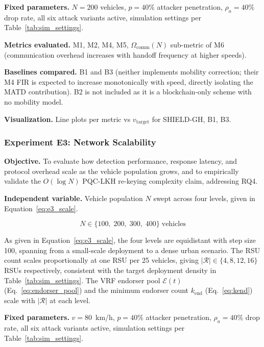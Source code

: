 \documentclass[12pt, a4paper]{report}
\newcommand{\mypar}{\vspace{0.8em}\noindent}
\begin{document}
\mypar
\textbf{Fixed parameters.}
$N = 200$ vehicles, $p = 40\%$ attacker penetration,
$\rho_a = 40\%$ drop rate, all six attack variants active,
simulation settings per Table~\ref{tab:sim_settings}.

\mypar
\textbf{Metrics evaluated.} M1, M2, M4, M5,
$\Omega_{\text{comm}}(N)$ sub-metric of M6
(communication overhead increases with handoff frequency at
higher speeds).

\mypar
\textbf{Baselines compared.}
B1 and B3 (neither implements mobility correction; their M4 FIR is
expected to increase monotonically with speed, directly isolating
the MATD contribution). B2 is not included as it is a blockchain-only
scheme with no mobility model.

\mypar
\textbf{Visualization.}
Line plots per metric vs $v_{\text{target}}$ for SHIELD-GH, B1, B3.

\mypar
\subsubsection{Experiment E3: Network Scalability}
\label{sec:exp3}

\mypar
\textbf{Objective.}
To evaluate how detection performance, response latency, and protocol
overhead scale as the vehicle population grows, and to empirically
validate the $O(\log N)$ PQC-LKH re-keying complexity claim, addressing
RQ4.

\mypar
\textbf{Independent variable.}
Vehicle population $N$ swept across four levels, given in
Equation~\eqref{eq:e3_scale}.

\begin{equation}
\label{eq:e3_scale}
N \in \{100,\; 200,\; 300,\; 400\}\;\text{vehicles}
\end{equation}

As given in Equation~\eqref{eq:e3_scale}, the four levels are
equidistant with step size 100, spanning from a small-scale
deployment to a dense urban scenario. The RSU count scales
proportionally at one RSU per 25 vehicles, giving
$|\mathcal{R}| \in \{4, 8, 12, 16\}$ RSUs respectively, consistent
with the target deployment density in Table~\ref{tab:sim_settings}.
The VRF endorser pool $\mathcal{E}(t)$ (Eq.~\eqref{eq:endorser_pool})
and the minimum endorser count $k_{\text{end}}$
(Eq.~\eqref{eq:kend}) scale with $|\mathcal{R}|$ at each level.

\mypar
\textbf{Fixed parameters.}
$v = 80$~km/h, $p = 40\%$ attacker penetration, $\rho_a = 40\%$
drop rate, all six attack variants active, simulation settings per
Table~\ref{tab:sim_settings}.
\end{document}
